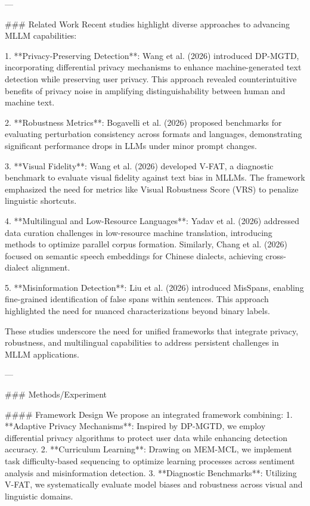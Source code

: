 ---

### Related Work
Recent studies highlight diverse approaches to advancing MLLM capabilities:

1. **Privacy-Preserving Detection**: Wang et al. (2026) introduced DP-MGTD, incorporating differential privacy mechanisms to enhance machine-generated text detection while preserving user privacy. This approach revealed counterintuitive benefits of privacy noise in amplifying distinguishability between human and machine text.

2. **Robustness Metrics**: Bogavelli et al. (2026) proposed benchmarks for evaluating perturbation consistency across formats and languages, demonstrating significant performance drops in LLMs under minor prompt changes.

3. **Visual Fidelity**: Wang et al. (2026) developed V-FAT, a diagnostic benchmark to evaluate visual fidelity against text bias in MLLMs. The framework emphasized the need for metrics like Visual Robustness Score (VRS) to penalize linguistic shortcuts.

4. **Multilingual and Low-Resource Languages**: Yadav et al. (2026) addressed data curation challenges in low-resource machine translation, introducing methods to optimize parallel corpus formation. Similarly, Chang et al. (2026) focused on semantic speech embeddings for Chinese dialects, achieving cross-dialect alignment.

5. **Misinformation Detection**: Liu et al. (2026) introduced MisSpans, enabling fine-grained identification of false spans within sentences. This approach highlighted the need for nuanced characterizations beyond binary labels.

These studies underscore the need for unified frameworks that integrate privacy, robustness, and multilingual capabilities to address persistent challenges in MLLM applications.

---

### Methods/Experiment

#### Framework Design
We propose an integrated framework combining:
1. **Adaptive Privacy Mechanisms**: Inspired by DP-MGTD, we employ differential privacy algorithms to protect user data while enhancing detection accuracy.
2. **Curriculum Learning**: Drawing on MEM-MCL, we implement task difficulty-based sequencing to optimize learning processes across sentiment analysis and misinformation detection.
3. **Diagnostic Benchmarks**: Utilizing V-FAT, we systematically evaluate model biases and robustness across visual and linguistic domains.

